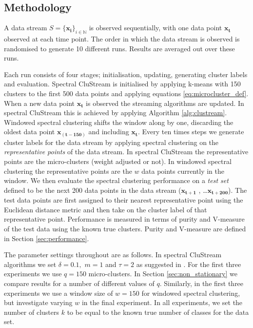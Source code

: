 \subsection{Methodology}
\label{sec:methodology}
A data stream $S = \{ \boldsymbol{x_i} \}_{i \in \mathbb{N}}$ is observed sequentially, with one data point $\boldsymbol{x_t}$ observed at each time point.  The order in which the data stream is observed is randomised to generate 10 different runs.  Results are averaged out over these runs. 

Each run consists of four stages; initialisation, updating,  generating cluster labels and evaluation. Spectral CluStream is initialised by applying k-means with 150 clusters to the first 500 data points and applying equations \eqref{eq:microcluster_def}. When a new data point  $\boldsymbol{x_t}$ is observed the streaming algorithms are updated. In spectral CluStream this is achieved by applying Algorithm \ref{alg:clustream}. Windowed spectral clustering shifts the window along by one, discarding the oldest data point $\boldsymbol{x_{(t-150)}}$ and including $\boldsymbol{x_t}$. Every ten times steps we generate cluster labels for the data stream by applying spectral clustering on the \textit{representative points} of the data stream. In spectral CluStream the representative points are the micro-clusters (weight adjusted or not). In windowed spectral clustering the representative points are the $w$ data points currently in the window. We then evaluate the spectral clustering performance on a \textit{test set} defined  to be the next 200 data points in the data stream ($\boldsymbol{x_{t+1}}$ , \ldots  $\boldsymbol{x_{t+200}}$). The test data points are first assigned to their nearest representative point using the Euclidean distance metric and then take on the cluster label of that representative point. Performance is measured in terms of purity and V-measure of the test data using the known true clusters. Purity and V-measure are defined in Section \ref{sec:performance}.

The parameter settings throughout are as follows. In spectral CluStream algorithms we set $\delta = 0.1,$ $m = 1$ and $ \tau = 2$ as suggested in \cite{Aggarwal2003}. For the first three experiments we use $q = 150$ micro-clusters. In Section \ref{sec:non_stationary} we compare results for a number of different values of $q$. Similarly, in the first three experiments we use a window size of $w = 150$ for windowed spectral clustering, but investigate varying $w$ in the final experiment. In all experiments, we set the number of clusters $k$ to be equal to the known true number of classes for the data set. 


